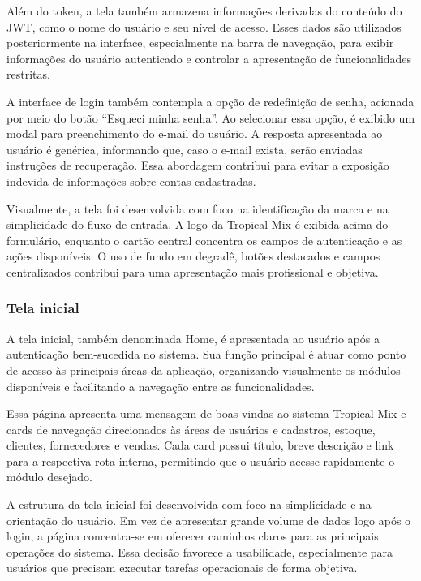 Além do token, a tela também armazena informações derivadas do conteúdo do JWT, como o nome do usuário e seu nível de acesso. Esses dados são utilizados posteriormente na interface, especialmente na barra de navegação, para exibir informações do usuário autenticado e controlar a apresentação de funcionalidades restritas.

A interface de login também contempla a opção de redefinição de senha, acionada por meio do botão ``Esqueci minha senha''. Ao selecionar essa opção, é exibido um modal para preenchimento do e-mail do usuário. A resposta apresentada ao usuário é genérica, informando que, caso o e-mail exista, serão enviadas instruções de recuperação. Essa abordagem contribui para evitar a exposição indevida de informações sobre contas cadastradas.

Visualmente, a tela foi desenvolvida com foco na identificação da marca e na simplicidade do fluxo de entrada. A logo da Tropical Mix é exibida acima do formulário, enquanto o cartão central concentra os campos de autenticação e as ações disponíveis. O uso de fundo em degradê, botões destacados e campos centralizados contribui para uma apresentação mais profissional e objetiva.

\subsubsection{Tela inicial}

A tela inicial, também denominada Home, é apresentada ao usuário após a autenticação bem-sucedida no sistema. Sua função principal é atuar como ponto de acesso às principais áreas da aplicação, organizando visualmente os módulos disponíveis e facilitando a navegação entre as funcionalidades.

Essa página apresenta uma mensagem de boas-vindas ao sistema Tropical Mix e cards de navegação direcionados às áreas de usuários e cadastros, estoque, clientes, fornecedores e vendas. Cada card possui título, breve descrição e link para a respectiva rota interna, permitindo que o usuário acesse rapidamente o módulo desejado.

A estrutura da tela inicial foi desenvolvida com foco na simplicidade e na orientação do usuário. Em vez de apresentar grande volume de dados logo após o login, a página concentra-se em oferecer caminhos claros para as principais operações do sistema. Essa decisão favorece a usabilidade, especialmente para usuários que precisam executar tarefas operacionais de forma objetiva.

